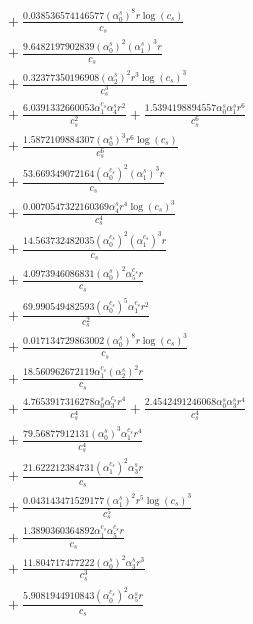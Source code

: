 \documentclass[10pt]{article}
\begin{document}
\begin{align*}
&{}  + \frac{0.038536574146577 \left(\alpha_{0}^s\right)^{8} r \log{\left(c_{s} \right)}}{c_{s}} \\
&{}  + \frac{9.6482197902839 \left(\alpha_{0}^s\right)^{2} \left(\alpha_{1}^s\right)^{3} r}{c_{s}} \\
&{}  + \frac{0.32377350196908 \left(\alpha_{2}^s\right)^{2} r^{3} \log{\left(c_{s} \right)}^{3}}{c_{s}^{3}} \\
&{}  + \frac{6.0391332660053 \alpha_{1}^{c_s} \alpha_{4}^s r^{2}}{c_{s}^{2}} + \frac{1.5394198894557 \alpha_{0}^s \alpha_{1}^s r^{6}}{c_{s}^{6}} \\
&{}  + \frac{1.5872109884307 \left(\alpha_{0}^s\right)^{3} r^{6} \log{\left(c_{s} \right)}}{c_{s}^{6}} \\
&{}  + \frac{53.669349072164 \left(\alpha_{0}^{c_s}\right)^{2} \left(\alpha_{1}^s\right)^{3} r}{c_{s}} \\
&{}  + \frac{0.0070547322160369 \alpha_{4}^s r^{4} \log{\left(c_{s} \right)}^{3}}{c_{s}^{4}} \\
&{}  + \frac{14.563732482035 \left(\alpha_{0}^{c_s}\right)^{2} \left(\alpha_{1}^{c_s}\right)^{3} r}{c_{s}} \\
&{}  + \frac{4.0973946086831 \left(\alpha_{0}^s\right)^{2} \alpha_{5}^{c_s} r}{c_{s}} \\
&{}  + \frac{69.990549482593 \left(\alpha_{0}^{c_s}\right)^{5} \alpha_{1}^{c_s} r^{2}}{c_{s}^{2}} \\
&{}  + \frac{0.017134729863002 \left(\alpha_{0}^s\right)^{8} r \log{\left(c_{s} \right)}^{3}}{c_{s}} \\
&{}  + \frac{18.560962672119 \alpha_{1}^{c_s} \left(\alpha_{2}^s\right)^{2} r}{c_{s}} \\
&{}  + \frac{4.7653917316278 \alpha_{0}^s \alpha_{3}^{c_s} r^{4}}{c_{s}^{4}} + \frac{2.4542491246068 \alpha_{0}^s \alpha_{3}^s r^{4}}{c_{s}^{4}} \\
&{}  + \frac{79.56877912131 \left(\alpha_{0}^s\right)^{3} \alpha_{1}^{c_s} r^{4}}{c_{s}^{4}} \\
&{}  + \frac{21.622212384731 \left(\alpha_{1}^{c_s}\right)^{2} \alpha_{3}^s r}{c_{s}} \\
&{}  + \frac{0.043143471529177 \left(\alpha_{1}^s\right)^{2} r^{5} \log{\left(c_{s} \right)}^{3}}{c_{s}^{5}} \\
&{}  + \frac{1.3890360364892 \alpha_{1}^{c_s} \alpha_{5}^{c_s} r}{c_{s}} \\
&{}  + \frac{11.804717477222 \left(\alpha_{0}^s\right)^{2} \alpha_{3}^s r^{3}}{c_{s}^{3}} \\
&{}  + \frac{5.9081944910843 \left(\alpha_{0}^{c_s}\right)^{2} \alpha_{5}^s r}{c_{s}} \\

\end{align*}
\end{document}

